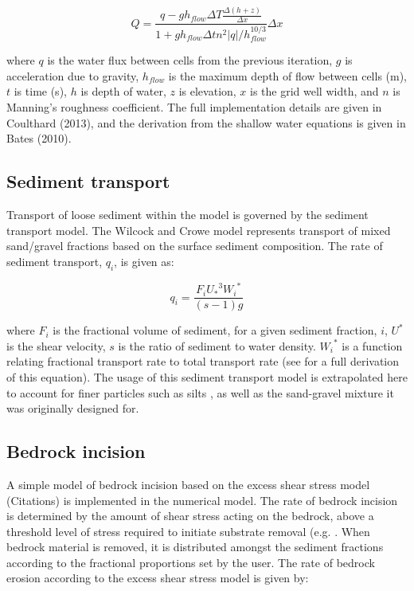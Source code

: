 \begin{equation}
Q = \frac{q - g h_{flow} \Delta T \frac{\Delta (h+z) }{\Delta x}}{1 + g h_{flow} \Delta t n^2 |q| / h_{flow}^{10/3}} \Delta x
\end{equation}

where \(q\) is the water flux between cells from the previous iteration, \(g\) is acceleration due to gravity, \(h_{flow}\) is the maximum depth of flow between cells (m), \(t\) is time (s), \(h\) is depth of water, \(z\) is elevation, \(x\) is the grid well width, and \(n\) is Manning's roughness coefficient. The full implementation details are given in Coulthard (2013), and the derivation from the shallow water equations is given in Bates (2010).

\subsection{Sediment transport}
Transport of loose sediment within the model is governed by the \citet{Wilcock2003} sediment transport model. The Wilcock and Crowe model represents transport of mixed sand/gravel fractions based on the surface sediment composition. The rate of sediment transport, \(q_i\), is given as:

\begin{equation}
q_i = \frac{F_i {U_*}^3 {W_i}^*}{(s -1) g}
\end{equation}

where \(F_i\) is the fractional volume of sediment, for a given sediment fraction, \(i\), \(U^*\) is the shear velocity, \(s\) is the ratio of sediment to water density. \({W_i}^*\) is a function relating fractional transport rate to total transport rate (see \citet{Wilcock2003} for a full derivation of this equation). The usage of this sediment transport model is extrapolated here to account for finer particles such as silts \citep{Vandewiel2007}, as well as the sand-gravel mixture it was originally designed for.

\subsection{Bedrock incision}
\label{bedrock_model}
A simple model of bedrock incision based on the excess shear stress model (Citations) is implemented in the numerical model. The rate of bedrock incision is determined by the amount of shear stress acting on the bedrock, above a threshold level of stress required to initiate substrate removal (e.g. \citet{Snyder2003}. When bedrock material is removed, it is distributed amongst the sediment fractions according to the fractional proportions set by the user. The rate of bedrock erosion according to the excess shear stress model is given by:

